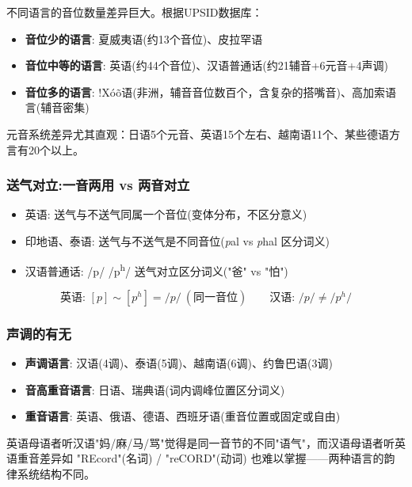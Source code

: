 不同语言的音位数量差异巨大。根据UPSID数据库：
\begin{itemize}
    \item \textbf{音位少的语言}: 夏威夷语(约13个音位)、皮拉罕语
    \item \textbf{音位中等的语言}: 英语(约44个音位)、汉语普通话(约21辅音+6元音+4声调)
    \item \textbf{音位多的语言}: !Xóõ语(非洲，辅音音位数百个，含复杂的搭嘴音)、高加索语言(辅音密集)
\end{itemize}

元音系统差异尤其直观：日语5个元音、英语15个左右、越南语11个、某些德语方言有20个以上。

\subsubsection{送气对立:一音两用 vs 两音对立}

\begin{itemize}
    \item 英语: 送气与不送气同属一个音位(变体分布，不区分意义)
    \item 印地语、泰语: 送气与不送气是不同音位(\emph{p}al vs \emph{p}hal 区分词义)
    \item 汉语普通话: /p/ /p\textsuperscript{h}/ 送气对立区分词义("爸" vs "怕")
\end{itemize}

\begin{equation}
    \text{英语: } [p] \sim [p^h] = /p/\ (\text{同一音位}) \qquad \text{汉语: } /p/ \neq /p^h/
\end{equation}

\subsubsection{声调的有无}

\begin{itemize}
    \item \textbf{声调语言}: 汉语(4调)、泰语(5调)、越南语(6调)、约鲁巴语(3调)
    \item \textbf{音高重音语言}: 日语、瑞典语(词内调峰位置区分词义)
    \item \textbf{重音语言}: 英语、俄语、德语、西班牙语(重音位置或固定或自由)
\end{itemize}

英语母语者听汉语"妈/麻/马/骂"觉得是同一音节的不同"语气"，而汉语母语者听英语重音差异如 "REcord"(名词) / "reCORD"(动词) 也难以掌握——两种语言的韵律系统结构不同。

